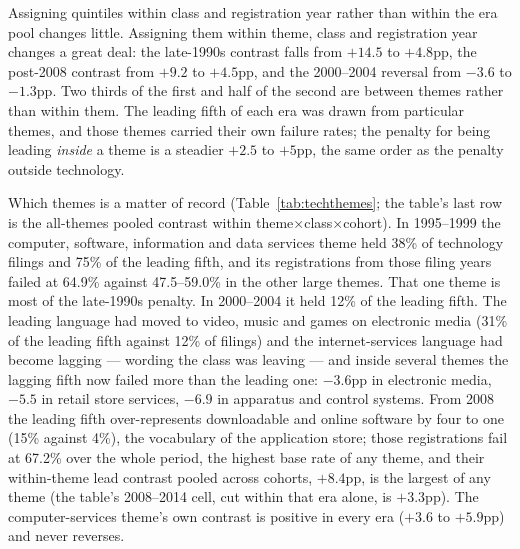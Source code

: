Assigning quintiles within class and registration year rather than within
the era pool changes little. Assigning them within theme, class and
registration year changes a great deal: the late-1990s contrast falls
from $+14.5$ to $+4.8$pp, the post-2008 contrast from $+9.2$ to $+4.5$pp,
and the 2000--2004 reversal from $-3.6$ to $-1.3$pp. Two thirds of the
first and half of the second are between themes rather than within them.
The leading fifth of each era was drawn from particular themes, and those
themes carried their own failure rates; the penalty for being leading
\emph{inside} a theme is a steadier $+2.5$ to $+5$pp, the same order as
the penalty outside technology.

Which themes is a matter of record (Table~\ref{tab:techthemes}; the
table's last row is the all-themes pooled contrast within
theme$\times$class$\times$cohort). In 1995--1999 the computer, software,
information and data services theme held 38\% of technology filings and
75\% of the leading fifth, and its registrations from those filing years
failed at 64.9\% against 47.5--59.0\% in the other large themes. That one
theme is most of the late-1990s penalty. In 2000--2004 it held 12\% of
the leading fifth. The leading language had moved to video, music and
games on electronic media (31\% of the leading fifth against 12\% of
filings) and the internet-services language had become lagging ---
wording the class was leaving --- and inside several themes the lagging
fifth now failed more than the leading one: $-3.6$pp in electronic media,
$-5.5$ in retail store services, $-6.9$ in apparatus and control systems.
From 2008 the leading fifth over-represents downloadable and online
software by four to one (15\% against 4\%), the vocabulary of the
application store; those registrations fail at 67.2\% over the whole
period, the highest base rate of any theme, and their within-theme lead
contrast pooled across cohorts, $+8.4$pp, is the largest of any theme
(the table's 2008--2014 cell, cut within that era alone, is $+3.3$pp).
The computer-services theme's own contrast is positive in every era
($+3.6$ to $+5.9$pp) and never reverses.

\begin{table}[h]\centering\footnotesize
\caption{The leading penalty at the five-year proof by theme within the
four technology classes. Themes with at least 20{,}000 settled
registrations, labelled by their five highest-probability terms;
quintiles assigned within theme and era. Cells with fewer than 3{,}000
registrations are blank. The final row pools all themes, with quintiles
cut within theme$\times$class$\times$cohort.}
\label{tab:techthemes}

\end{table}

